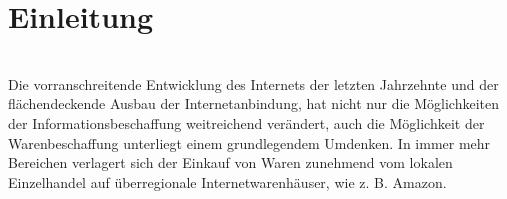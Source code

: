 %
\chapter{Einleitung}
\label{sec:Einleitung}

 \\[20mm]


Die vorranschreitende Entwicklung des Internets der letzten Jahrzehnte und der flächendeckende Ausbau der Internetanbindung, hat nicht nur die Möglichkeiten der Informationsbeschaffung weitreichend verändert, auch die Möglichkeit der Warenbeschaffung unterliegt einem grundlegendem Umdenken. In immer mehr Bereichen verlagert sich der Einkauf von Waren zunehmend vom lokalen Einzelhandel auf \cite[22]{Jurgens:1995} überregionale Internetwarenhäuser, wie z. B. Amazon.

